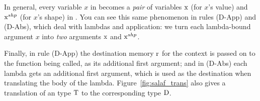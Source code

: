 In general, every variable $x$ in \lafsharp{} becomes a \emph{pair} of variables $\text{$\text{x}$}$ (for $x$'s value) and $\text{$\text{x}^{shp}$}$ (for $x$'s shape) in \salafsharp{}.  You can see this same phenomenon in
rules (D-App) and (D-Abs), which deal with lambdas and application: we turn each lambda-bound argument $x$ into \emph{two} arguments $\text{$\text{x}$}$ and $\text{$\text{x}^{shp}$}$.

Finally, in rule (D-App) the destination memory $\text{r}$ for the context is passed on to the function being called, as its additional first argument; and in (D-Abs) each lambda gets an additional first argument, which is used as the destination when translating the body of the lambda.  Figure~\ref{fig:salaf_trans} also gives a translation of an \lafsharp{} type $\textnormal{T}$ to the corresponding \salafsharp{} type $\textnormal{D}$.






